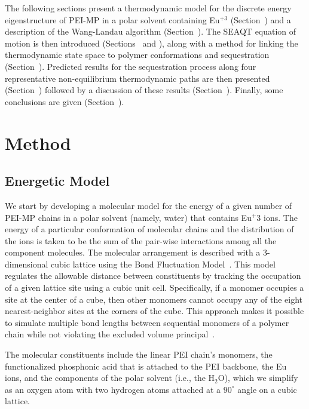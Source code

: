 \documentclass[
journal=jcisd8, %
manuscript=article,
layout=twocolumn   %
]{achemso}
\begin{document}
The following sections present a thermodynamic model for the discrete energy eigenstructure of PEI-MP in a polar solvent containing Eu$^{+3}$ (Section~) and a description of the Wang-Landau algorithm (Section~). The SEAQT equation of motion is then introduced (Sections~ and ), along with a method for linking the thermodynamic state space to polymer conformations and sequestration (Section~). Predicted results for the sequestration process along four representative non-equilibrium thermodynamic paths are then presented (Section~) followed by a discussion of these results  (Section~). Finally, some conclusions are given (Section~).

\section{Method}
\subsection{Energetic Model}\label{SectionIIA}


We start by developing a molecular model for the energy of a given number of PEI-MP chains in a polar solvent (namely, water) that contains Eu$^+3$ ions. The energy of a particular conformation of molecular chains and the distribution of the ions is taken to be the sum of the pair-wise interactions among all the component molecules.  The molecular arrangement is described with a 3-dimensional cubic lattice using the Bond Fluctuation Model~\cite{Carmesin1988, Deutsch1991}. This model regulates the allowable distance between constituents by tracking the occupation of a given lattice site using a cubic unit cell. Specifically, if a monomer occupies a site at the center of a cube, then other monomers cannot occupy any of the eight nearest-neighbor sites at the corners of the cube. This approach makes it possible to simulate multiple bond lengths between sequential monomers of a polymer chain while not violating the excluded volume principal~\cite{Carmesin1988, Deutsch1991}.

The molecular constituents include the linear PEI chain's monomers, the functionalized phosphonic acid that is attached to the PEI backbone, the Eu ions, and the components of the polar solvent (i.e., the H$_2$O), which we simplify as an oxygen atom with two hydrogen atoms attached at a $90^\circ$ angle on a cubic lattice.
\end{document}
